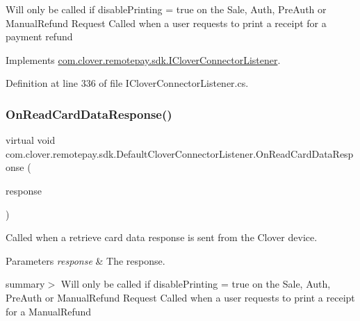Will only be called if disable\+Printing = true on the Sale, Auth, Pre\+Auth or Manual\+Refund Request Called when a user requests to print a receipt for a payment refund 



Implements \hyperlink{interfacecom_1_1clover_1_1remotepay_1_1sdk_1_1_i_clover_connector_listener_a728073276539065bc64d4eea1009394d}{com.\+clover.\+remotepay.\+sdk.\+I\+Clover\+Connector\+Listener}.



Definition at line 336 of file I\+Clover\+Connector\+Listener.\+cs.

\mbox{\label{classcom_1_1clover_1_1remotepay_1_1sdk_1_1_default_clover_connector_listener_abf40aa043a50f59be9e36c3911ac895d}} 
\subsubsection{\texorpdfstring{On\+Read\+Card\+Data\+Response()}{OnReadCardDataResponse()}}
{\footnotesize\ttfamily virtual void com.\+clover.\+remotepay.\+sdk.\+Default\+Clover\+Connector\+Listener.\+On\+Read\+Card\+Data\+Response (\begin{DoxyParamCaption}\item[{\hyperlink{classcom_1_1clover_1_1remotepay_1_1sdk_1_1_read_card_data_response}{Read\+Card\+Data\+Response}}]{response }\end{DoxyParamCaption})\hspace{0.3cm}{\ttfamily [virtual]}}



Called when a retrieve card data response is sent from the Clover device. 


\begin{DoxyParams}{Parameters}
{\em response} & The response.\\
\hline
\end{DoxyParams}
summary$>$ Will only be called if disable\+Printing = true on the Sale, Auth, Pre\+Auth or Manual\+Refund Request Called when a user requests to print a receipt for a Manual\+Refund 


